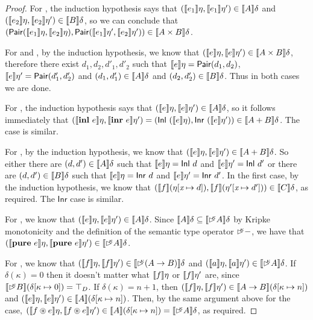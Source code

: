 \begin{proof}
  For , the induction hypothesis says that
  $(\llbracket e_1 \rrbracket\eta, \llbracket e_1 \rrbracket\eta') \in \llbracket A \rrbracket\delta$ and
  $(\llbracket e_2 \rrbracket\eta, \llbracket e_2 \rrbracket\eta') \in \llbracket B \rrbracket\delta$, so we can conclude
  that $(\mathsf{Pair}(\llbracket e_1 \rrbracket\eta, \llbracket e_2 \rrbracket\eta),
  \mathsf{Pair}(\llbracket e_1 \rrbracket\eta', \llbracket e_2 \rrbracket\eta')) \in \llbracket A \times
    B \rrbracket\delta$.

  For  and , by the induction hypothesis, we
  know that $(\llbracket e \rrbracket\eta, \llbracket e \rrbracket\eta') \in \llbracket A \times B \rrbracket\delta$,
  therefore there exist $d_1,d_2,d'_1,d'_2$ such that $\llbracket e \rrbracket\eta =
  \mathsf{Pair}(d_1, d_2)$, $\llbracket e \rrbracket\eta' =
  \mathsf{Pair}(d'_1,d'_2)$ and $(d_1,d'_1) \in \llbracket A \rrbracket\delta$ and
  $(d_2,d'_2) \in \llbracket B \rrbracket\delta$. Thus in both cases we are done.

  For , the induction hypothesis says that $(\llbracket e \rrbracket\eta,
  \llbracket e \rrbracket\eta') \in \llbracket A \rrbracket\delta$, so it follows immediately that
  $(\sem{\kw{inl}\ e}\eta, \sem{\kw{inr}\ e}\eta') = (\semCons{Inl}\
  (\sem{e}\eta), \semCons{Inr}\ (\sem{e}\eta')) \in \sem{A +
    B}\delta$. The  case is similar.

  For , by the induction hypothesis, we know that
  $(\llbracket e \rrbracket\eta, \llbracket e \rrbracket\eta') \in \llbracket A + B \rrbracket\delta$. So either there
  are $(d,d') \in \llbracket A \rrbracket\delta$ such that $\llbracket e \rrbracket\eta =
  \mathsf{Inl}\ d$ and $\llbracket e \rrbracket\eta' = \mathsf{Inl}\ d'$ or there
  are $(d,d') \in \llbracket B \rrbracket\delta$ such that $\llbracket e \rrbracket\eta =
  \mathsf{Inr}\ d$ and $\llbracket e \rrbracket\eta' = \mathsf{Inr}\ d'$. In the
  first case, by the induction hypothesis, we know that
  $(\llbracket f \rrbracket(\eta[\textit{x} \mapsto d]), \llbracket f \rrbracket(\eta'[\textit{x}
  \mapsto d'])) \in \llbracket C \rrbracket\delta$, as required. The $\mathsf{Inr}$
  case is similar.

  For , we know that $(\llbracket e \rrbracket\eta, \llbracket e \rrbracket\eta') \in
  \llbracket A \rrbracket\delta$. Since $\llbracket A \rrbracket\delta \subseteq \llbracket \mathord{\rhd\kern-0.4em^{\kappa}}
    A \rrbracket\delta$ by Kripke monotonicity and the definition of the
  semantic type operator $\mathord{\rhd\kern-0.4em^{\kappa}}-$, we have that
  $(\llbracket \textbf{pure}\ e \rrbracket\eta, \llbracket \textbf{pure}\ e \rrbracket\eta') \in
  \llbracket \mathord{\rhd\kern-0.4em^{\kappa}} A \rrbracket\delta$.

  For , we know that $(\llbracket f \rrbracket\eta,\llbracket f \rrbracket\eta') \in
  \llbracket \mathord{\rhd\kern-0.4em^{\kappa}}(A \to B) \rrbracket\delta$ and $(\llbracket a \rrbracket\eta,\llbracket a \rrbracket\eta')
  \in \llbracket \mathord{\rhd\kern-0.4em^{\kappa}} A \rrbracket\delta$. If $\delta(\kappa) = 0$ then it
  doesn't matter what $\llbracket f \rrbracket\eta$ or $\llbracket f \rrbracket\eta'$ are, since
  $\llbracket \mathord{\rhd\kern-0.4em^{\kappa}} B \rrbracket(\delta[\kappa\mapsto 0]) = \top_D$. If
  $\delta(\kappa) = n + 1$, then $(\llbracket f \rrbracket\eta, \llbracket f \rrbracket\eta') \in
  \llbracket A \to B \rrbracket(\delta[\kappa \mapsto n])$ and $(\llbracket e \rrbracket\eta,
  \llbracket e \rrbracket\eta') \in \llbracket A \rrbracket(\delta[\kappa \mapsto n])$. Then, by the
  same argument above for the \TirName{App} case, $(\llbracket f \circledast
    e \rrbracket\eta, \llbracket f \circledast e \rrbracket\eta') \in \llbracket A \rrbracket(\delta[\kappa
  \mapsto n]) = \llbracket \mathord{\rhd\kern-0.4em^{\kappa}} A \rrbracket\delta$, as required.


\end{proof}
